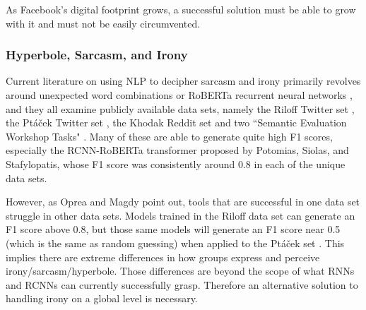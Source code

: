 \documentclass[preprint,review,12pt]{elsarticle}
\begin{document}
As Facebook's digital footprint grows, a successful solution must be able to grow with it and must not be easily circumvented. 

\subsubsection{Hyperbole, Sarcasm, and Irony}
\label{hyperbole}
Current literature on using NLP to decipher sarcasm and irony primarily revolves around unexpected word combinations \cite{barbieri2014modelling,buschmeier2014impact,ghosh2015sarcastic} or RoBERTa recurrent neural networks \cite{potamias2020transformer}, and they all examine publicly available data sets, namely the Riloff Twitter set \cite{riloff2013sarcasm}, the Pt{\'a}{\v{c}}ek Twitter set \cite{ptavcek2014sarcasm}, the Khodak Reddit set \cite{khodak2017large} and two ``Semantic Evaluation Workshop Tasks" \cite{van2018semeval,ghosh2015semeval}. Many of these are able to generate quite high F1 scores, especially the RCNN-RoBERTa transformer proposed by Potomias, Siolas, and Stafylopatis, whose F1 score was consistently around 0.8 in each of the unique data sets. 

However, as Oprea and Magdy point out, tools that are successful in one data set struggle in other data sets. Models trained in the Riloff data set can generate an F1 score above 0.8, but those same models will generate an F1 score near 0.5 (which is the same as random guessing) when applied to the Pt{\'a}{\v{c}}ek set \cite{oprea2019exploring}. This implies there are extreme differences in how groups express and perceive irony/sarcasm/hyperbole. Those differences are beyond the scope of what RNNs and RCNNs can currently successfully grasp. Therefore an alternative solution to handling irony on a global level is necessary. 
\end{document}
